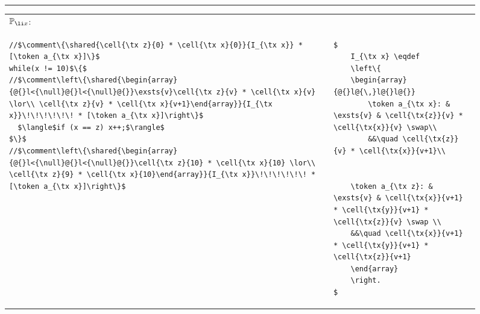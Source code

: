 %
%
%
\begin{figure}
\centering
\noindent\hrule\vspace{5pt}
\begin{tabular}{@{} l @{\hspace{15pt}} l@{\ }}
{$\mathbb{P}_{\li x}$:}&  \vspace{-10pt}\\
\begin{lstlisting}
//$\comment\{\shared{\cell{\tx z}{0} * \cell{\tx x}{0}}{I_{\tx x}} * [\token a_{\tx x}]\}$
while(x != 10)$\{$
//$\comment\left\{\shared{\begin{array}{@{}l<{\null}@{}l<{\null}@{}}\exsts{v}\cell{\tx z}{v} * \cell{\tx x}{v} \lor\\ \cell{\tx z}{v} * \cell{\tx x}{v+1}\end{array}}{I_{\tx x}}\!\!\!\!\!\! * [\token a_{\tx x}]\right\}$
  $\langle$if (x == z) x++;$\rangle$ 
$\}$
//$\comment\left\{\shared{\begin{array}{@{}l<{\null}@{}l<{\null}@{}}\cell{\tx z}{10} * \cell{\tx x}{10} \lor\\ \cell{\tx z}{9} * \cell{\tx x}{10}\end{array}}{I_{\tx x}}\!\!\!\!\!\! * [\token a_{\tx x}]\right\}$
\end{lstlisting}
&
\begin{lstlisting}
$
	I_{\tx x} \eqdef 
	\left\{
	\begin{array}{@{}l@{\,}l@{}l@{}} 
		\token a_{\tx x}: & \exsts{v} & \cell{\tx{z}}{v} * \cell{\tx{x}}{v} \swap\\ 
		&&\quad \cell{\tx{z}}{v} * \cell{\tx{x}}{v+1}\\
		
    
    \token a_{\tx z}: & \exsts{v} & \cell{\tx{x}}{v+1} * \cell{\tx{y}}{v+1} * \cell{\tx{z}}{v} \swap \\
    &&\quad \cell{\tx{x}}{v+1} * \cell{\tx{y}}{v+1} * \cell{\tx{z}}{v+1}
	\end{array}
	\right.
$
\end{lstlisting}\vspace{5pt}\\\hline


\end{tabular}
\end{figure}
